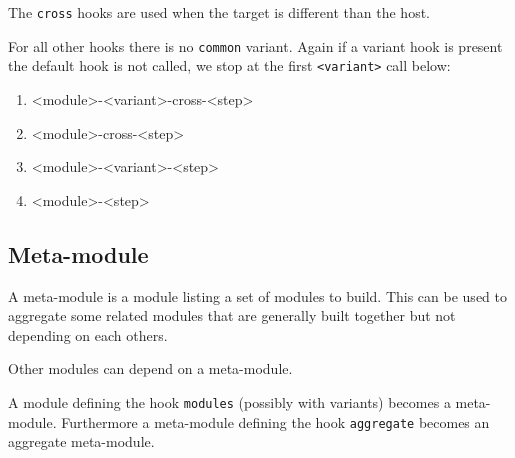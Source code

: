 \documentclass[a4paper,12pt,twoside]{article}
\newcommand{\code}[1]{\texttt{#1}}
\begin{document}
The \code{cross} hooks are used when the target is different than the host.

For all other hooks there is no \code{common} variant. Again if a variant hook is present the default hook is not called, we stop at the first \code{<variant>} call below:

\begin{enumerate}
	\item <module>-<variant>-cross-<step>
	\item <module>-cross-<step>
	\item <module>-<variant>-<step>
	\item <module>-<step>
\end{enumerate}

\subsection{Meta-module}
\label{meta-module}

A meta-module is a module listing a set of modules to build. This can be used to aggregate some related modules that are generally built together but not depending on each others.

Other modules can depend on a meta-module.

A module defining the hook \code{modules} (possibly with variants) becomes a meta-module. Furthermore a meta-module defining the hook \code{aggregate} becomes an aggregate meta-module.
\end{document}
